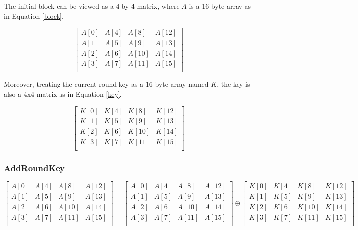 \documentclass[a4paper,10pt]{article}
\begin{document}
The initial block can be viewed as a 4-by-4 matrix, where $A$ is a 16-byte array as in Equation \eqref{block}.

\begin{equation}
 \begin{bmatrix}
  A[0] & A[4] & A[8] & A[12] \\
  A[1] & A[5] & A[9] & A[13] \\
  A[2] & A[6] & A[10] & A[14] \\
  A[3] & A[7] & A[11] & A[15] \\
 \end{bmatrix}
\label{block}
\end{equation}

Moreover, treating the current round key as a 16-byte array named $K$, the key is also a 4x4 matrix as in Equation \eqref{key}.

\begin{equation}
 \begin{bmatrix}
  K[0] & K[4] & K[8] & K[12] \\
  K[1] & K[5] & K[9] & K[13] \\
  K[2] & K[6] & K[10] & K[14] \\
  K[3] & K[7] & K[11] & K[15] \\
 \end{bmatrix}
\label{key}
\end{equation}

\subsubsection{AddRoundKey}

\begin{equation}
 \begin{bmatrix}
  A[0] & A[4] & A[8] & A[12] \\
  A[1] & A[5] & A[9] & A[13] \\
  A[2] & A[6] & A[10] & A[14] \\
  A[3] & A[7] & A[11] & A[15] \\
 \end{bmatrix}
 =
 \begin{bmatrix}
  A[0] & A[4] & A[8] & A[12] \\
  A[1] & A[5] & A[9] & A[13] \\
  A[2] & A[6] & A[10] & A[14] \\
  A[3] & A[7] & A[11] & A[15] \\
 \end{bmatrix}
 \oplus
 \begin{bmatrix}
  K[0] & K[4] & K[8] & K[12] \\
  K[1] & K[5] & K[9] & K[13] \\
  K[2] & K[6] & K[10] & K[14] \\
  K[3] & K[7] & K[11] & K[15] \\
 \end{bmatrix}
\label{addroundkey}
\end{equation}
\end{document}

